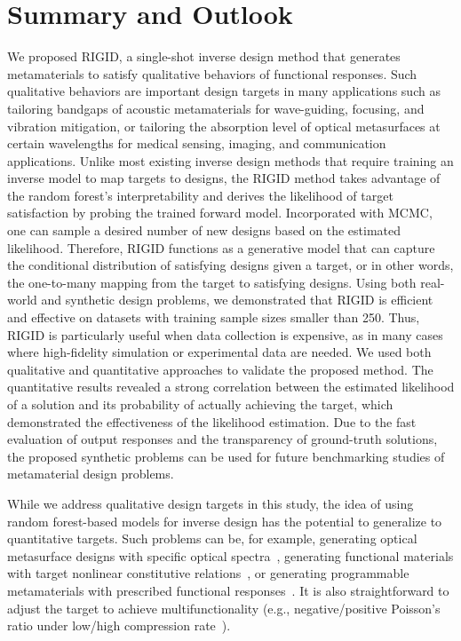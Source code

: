 \documentclass{article}
\begin{document}
\section{Summary and Outlook}
\label{sec:conclusion}

We proposed RIGID, a single-shot inverse design method that generates metamaterials to satisfy qualitative behaviors of functional responses. Such qualitative behaviors are important design targets in many applications such as tailoring bandgaps of acoustic metamaterials for wave-guiding, focusing, and vibration mitigation, or tailoring the absorption level of optical metasurfaces at certain wavelengths for medical sensing, imaging, and communication applications. Unlike most existing inverse design methods that require training an inverse model to map targets to designs, the RIGID method takes advantage of the random forest's interpretability and derives the likelihood of target satisfaction by probing the trained forward model. Incorporated with MCMC, one can sample a desired number of new designs based on the estimated likelihood. Therefore, RIGID functions as a generative model that can capture the conditional distribution of satisfying designs given a target, or in other words, the one-to-many mapping from the target to satisfying designs. Using both real-world and synthetic design problems, we demonstrated that RIGID is efficient and effective on datasets with training sample sizes smaller than 250. Thus, RIGID is particularly useful when data collection is expensive, as in many cases where high-fidelity simulation or experimental data are needed. We used both qualitative and quantitative approaches to validate the proposed method. The quantitative results revealed a strong correlation between the estimated likelihood of a solution and its probability of actually achieving the target, which demonstrated the effectiveness of the likelihood estimation. Due to the fast evaluation of output responses and the transparency of ground-truth solutions, the proposed synthetic problems can be used for future benchmarking studies of metamaterial design problems.

While we address qualitative design targets in this study, the idea of using random forest-based models for inverse design has the potential to generalize to quantitative targets. Such problems can be, for example, generating optical metasurface designs with specific optical spectra~\cite{liu2018generative, ma2019probabilistic}, generating functional materials with target nonlinear constitutive relations~\cite{lew2023single,vlassis2023denoising}, or generating programmable metamaterials with prescribed functional responses~\cite{li2022digital,lin2023mechanical}. It is also straightforward to adjust the target to achieve multifunctionality (e.g., negative/positive Poisson’s ratio under low/high compression rate~\cite{bossart2021oligomodal}).
\end{document}
